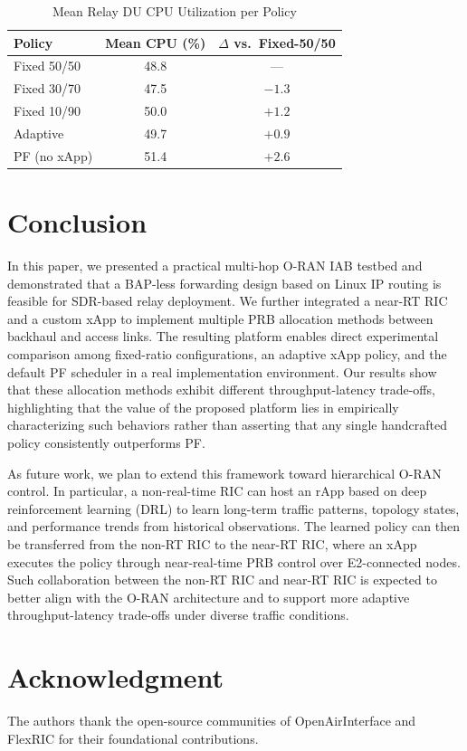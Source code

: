 \documentclass[conference, a4paper]{IEEEtran}
\begin{document}
\begin{table}[htbp]
\caption{Mean Relay DU CPU Utilization per Policy}
\centering
\begin{tabular}{lcc}
\toprule
\textbf{Policy} & \textbf{Mean CPU (\%)} & \textbf{$\Delta$ vs.\ Fixed-50/50} \\
\midrule
Fixed 50/50 & 48.8 & --- \\
Fixed 30/70 & 47.5 & $-1.3$ \\
Fixed 10/90 & 50.0 & $+1.2$ \\
Adaptive    & 49.7 & $+0.9$ \\
PF (no xApp)& 51.4 & $+2.6$ \\
\bottomrule
\end{tabular}
\label{tab:cpu}
\end{table}

\section{Conclusion}
In this paper, we presented a practical multi-hop O-RAN IAB testbed and demonstrated that a BAP-less forwarding design based on Linux IP routing is feasible for SDR-based relay deployment. We further integrated a near-RT RIC and a custom xApp to implement multiple PRB allocation methods between backhaul and access links. The resulting platform enables direct experimental comparison among fixed-ratio configurations, an adaptive xApp policy, and the default PF scheduler in a real implementation environment. Our results show that these allocation methods exhibit different throughput-latency trade-offs, highlighting that the value of the proposed platform lies in empirically characterizing such behaviors rather than asserting that any single handcrafted policy consistently outperforms PF.

As future work, we plan to extend this framework toward hierarchical O-RAN control. In particular, a non-real-time RIC can host an rApp based on deep reinforcement learning (DRL) to learn long-term traffic patterns, topology states, and performance trends from historical observations. The learned policy can then be transferred from the non-RT RIC to the near-RT RIC, where an xApp executes the policy through near-real-time PRB control over E2-connected nodes. Such collaboration between the non-RT RIC and near-RT RIC is expected to better align with the O-RAN architecture and to support more adaptive throughput-latency trade-offs under diverse traffic conditions.

\section*{Acknowledgment}
The authors thank the open-source communities of OpenAirInterface and FlexRIC for their foundational contributions.



\end{document}
